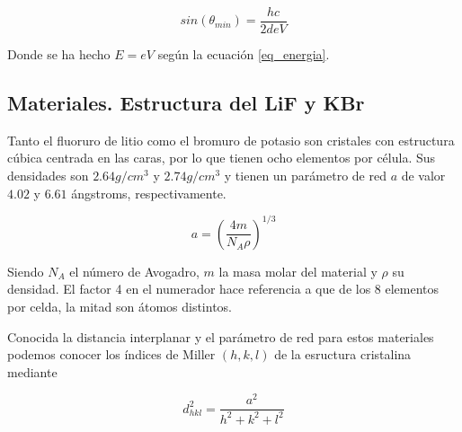 \begin{equation}
	sin(\theta_{min}) = \frac{hc}{2deV} \label{eq_angulo_min}
\end{equation}

Donde se ha hecho $E = eV$ según la ecuación \eqref{eq_energia}.

\subsection{Materiales. Estructura del LiF y KBr}

Tanto el fluoruro de litio como el bromuro de potasio son cristales con estructura cúbica centrada en las caras, por lo que tienen ocho elementos por célula. Sus densidades son $2.64 g/cm^3$ y $2.74 g/cm^3$ y tienen un parámetro de red $a$ de valor $4.02$ y $6.61$ ángstroms, respectivamente.

\begin{equation}
	a = (\frac{4m}{N_{A}\rho})^{1/3} \label{eq_parametro_red}
\end{equation}

Siendo $N_A$ el número de Avogadro, $m$ la masa molar del material y $\rho$ su densidad. El factor 4 en el numerador hace referencia a que de los 8 elementos por celda, la mitad son átomos distintos.

Conocida la distancia interplanar y el parámetro de red para estos materiales podemos conocer los índices de Miller $(h,k,l)$ de la esructura cristalina mediante

\begin{equation}
	d_{hkl}^{2} = \frac{a^2}{h^2 + k^2 + l^2} \label{eq_miller}
\end{equation}